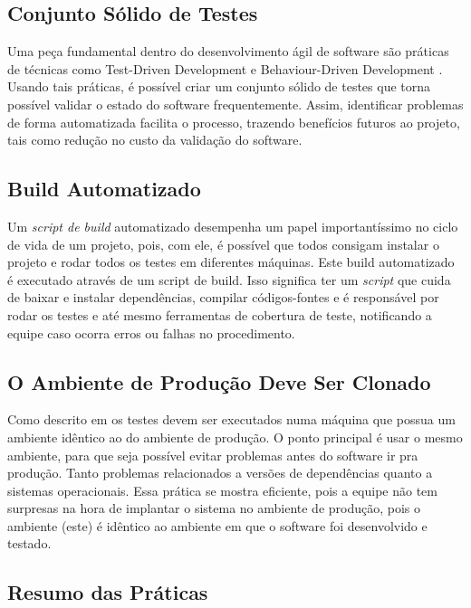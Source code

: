 \documentclass[10pt,a4paper,font=plain]{abnt}
\begin{document}
\subsection{Conjunto Sólido de Testes}

Uma peça fundamental dentro do desenvolvimento ágil de software são práticas de técnicas como Test-Driven Development \cite{TDD} e Behaviour-Driven Development \cite{BDD}. Usando tais práticas, é possível criar um conjunto sólido de testes que torna possível validar o estado do software frequentemente. Assim, identificar problemas de forma automatizada facilita o processo, trazendo benefícios futuros ao projeto, tais como redução no custo da validação do software.


\subsection{Build Automatizado}

Um \textit{script de build} automatizado desempenha um papel importantíssimo no ciclo de vida de um projeto, pois, com ele, é possível que todos consigam instalar o projeto e rodar todos os testes em diferentes máquinas. Este build automatizado é executado através de um script de build. Isso significa ter um \textit{script} que cuida de baixar e instalar dependências, compilar códigos-fontes e é responsável por rodar os testes e até mesmo ferramentas de cobertura de teste, notificando a equipe caso ocorra erros ou falhas no procedimento.


\subsection{O Ambiente de Produção Deve Ser Clonado}

Como descrito em \cite{Fowler} os testes devem ser executados numa máquina que possua um ambiente idêntico ao do ambiente de produção. O ponto principal é usar o mesmo ambiente, para que seja possível evitar problemas antes do software ir pra produção. Tanto problemas relacionados a versões de dependências quanto a sistemas operacionais. Essa prática se mostra eficiente, pois a equipe não tem surpresas na hora de implantar o sistema no ambiente de produção, pois o ambiente (este) é idêntico ao ambiente em que o software foi desenvolvido e testado.


\subsection{Resumo das Práticas}
\end{document}
